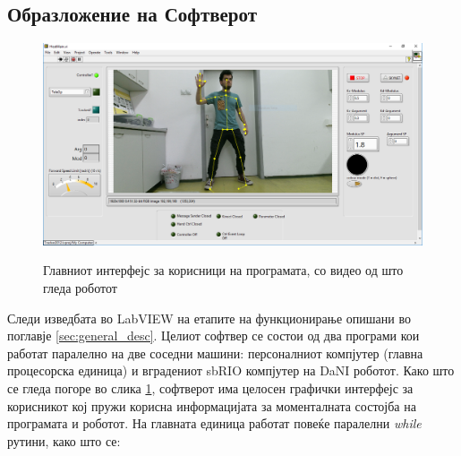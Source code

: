 \documentclass[11pt]{article}
\begin{document}
  \subsection{Образложение на Софтверот}
    \begin{figure}[H]
      \centering
      \includegraphics[width = 0.75\linewidth]{./images/pineapple_summer.png}
      \label{fig:pineapple}
      \caption{Главниот интерфејс за корисници на програмата, со видео од што гледа роботот}
    \end{figure}
    Следи изведбата во LabVIEW на етапите на функционирање опишани во поглавје \ref{sec:general_desc}. Целиот софтвер се состои од два програми кои работат паралелно на две соседни машини: персоналниот компјутер (главна процесорска единица) и вградениот sbRIO компјутер на DaNI роботот. Како што се гледа погоре во слика \ref{fig:pineapple}, софтверот има целосен графички интерфејс за корисникот кој пружи корисна информацијата за моменталната состојба на програмата и роботот. На главната единица работат повеќе паралелни \textit{while} рутини, како што се:
\end{document}

